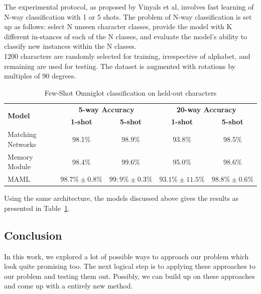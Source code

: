 The experimental protocol, as proposed by Vinyals et al\cite{DBLP:journals/corr/VinyalsBLKW16}, involves fast learning of N-way classification with 1 or 5 shots. The problem of N-way classification is set up as follows: select N unseen character classes, provide the model with K different in-stances of each of the N classes, and evaluate the model’s ability to classify new instances within the N classes.\\ 

1200 characters are randomly selected for training, irrespective of alphabet, and remaining are used for testing. The dataset is augmented with rotations by multiples of 90 degrees.\newline

\begin{table}[ht]
  \centering
  \renewcommand{\arraystretch}{1.2}
  \begin{tabular}{|p{2.5cm}|c|c|c|c|}
    \hline
    \multirow{2}{2.5cm}{\textbf{Model}} & \multicolumn{2}{c|}{\textbf{5-way Accuracy}} & \multicolumn{2}{c|}{\textbf{20-way Accuracy}} \\
    \cline{2-5}
    & \textbf{1-shot} & \textbf{5-shot} &\textbf{1-shot} & \textbf{5-shot}\\
    \hline
    Matching Networks\cite{DBLP:journals/corr/VinyalsBLKW16} &  98.1\% &  98.9\% &  93.8\% &  98.5\% \\ \hline
    Memory Module\cite{45801} & 98.4\% &  99.6\% &  95.0\% &  98.6\% \\ \hline
    MAML\cite{1703.03400} & $98.7\% \pm 0.8\%$ & $99:9\% \pm 0.3\%$ & $93.1\% \pm 11.5\%$ & $98.8\% \pm 0.6\%$ \\ \hline
  \end{tabular}
  \caption{\label{tab:results}Few-Shot Omniglot classification on held-out characters}
\end{table}

Using the same architecture, the models discussed above gives the results as presented in Table~\ref{tab:results}.

\subsection{Conclusion}
In this work, we explored a lot of possible ways to approach our problem which look quite promising too. The next logical step is to applying these approaches to our problem and testing them out. Possibly, we can build up on these approaches and come up with a entirely new method.

\pagebreak


\addtocounter{section}{1}


